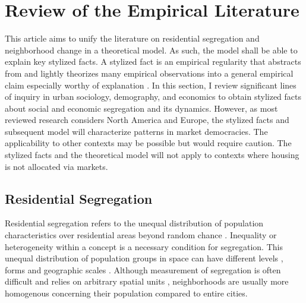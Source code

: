 \documentclass[a4paper,12pt]{article}
\begin{document}
\section{Review of the Empirical Literature}

This article aims to unify the literature on residential segregation and neighborhood change in a theoretical model. As such, the model shall be able to explain key stylized facts. A stylized fact is an empirical regularity that abstracts from and lightly theorizes many empirical observations into a general empirical claim especially worthy of explanation \citep{hirschmanStylizedFactsSocial2016}. In this section, I review significant lines of inquiry in urban sociology, demography, and economics to obtain stylized facts about social and economic segregation and its dynamics. However, as most reviewed research considers North America and Europe, the stylized facts and subsequent model will characterize patterns in market democracies. The applicability to other contexts may be possible but would require caution. The stylized facts and the theoretical model will not apply to contexts where housing is not allocated via markets. 


\subsection{Residential Segregation}

Residential segregation refers to the unequal distribution of population characteristics over residential areas beyond random chance \citep{masseyDimensionsResidentialSegregation1988, reardonNewApproachMeasuring2006}. Inequality or heterogeneity within a concept is a necessary condition for segregation. This unequal distribution of population groups in space can have different levels \citep{oecdDividedCitiesUnderstanding2018}, forms \citep{masseyDimensionsResidentialSegregation1988} and geographic scales \citep{leeCensusTractPatterns2008}. Although measurement of segregation is often difficult and relies on arbitrary spatial units \citep{reardonNewApproachMeasuring2006, leeCensusTractPatterns2008, leung-gagneItSurprisinglyDifficult2023}, neighborhoods are usually more homogenous concerning their population compared to entire cities.
\end{document}
